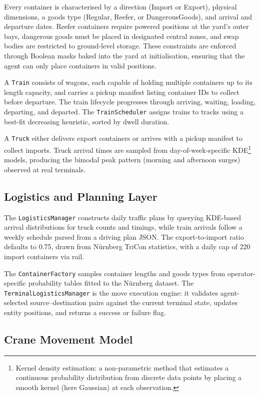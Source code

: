 Every container is characterised by a direction (Import or Export), physical dimensions, a goods type (Regular, Reefer, or DangerousGoods), and arrival and departure dates. Reefer containers require powered positions at the yard's outer bays, dangerous goods must be placed in designated central zones, and swap bodies are restricted to ground-level storage. These constraints are enforced through Boolean masks baked into the yard at initialisation, ensuring that the agent can only place containers in valid positions.

A \texttt{Train} consists of wagons, each capable of holding multiple containers up to its length capacity, and carries a pickup manifest listing container IDs to collect before departure. The train lifecycle progresses through arriving, waiting, loading, departing, and departed. The \texttt{TrainScheduler} assigns trains to tracks using a best-fit decreasing heuristic, sorted by dwell duration.

A \texttt{Truck} either delivers export containers or arrives with a pickup manifest to collect imports. Truck arrival times are sampled from day-of-week-specific KDE\footnote{Kernel density estimation: a non-parametric method that estimates a continuous probability distribution from discrete data points by placing a smooth kernel (here Gaussian) at each observation.} models, producing the bimodal peak pattern (morning and afternoon surges) observed at real terminals.

\subsection{Logistics and Planning Layer}
\label{sec:sys:env:logistics}

The \texttt{LogisticsManager} constructs daily traffic plans by querying KDE-based arrival distributions for truck counts and timings, while train arrivals follow a weekly schedule parsed from a driving plan JSON. The export-to-import ratio defaults to 0.75, drawn from N\"urnberg TriCon statistics, with a daily cap of 220 import containers via rail.

The \texttt{ContainerFactory} samples container lengths and goods types from operator-specific probability tables fitted to the N\"urnberg dataset. The \texttt{TerminalLogisticsManager} is the move execution engine: it validates agent-selected source--destination pairs against the current terminal state, updates entity positions, and returns a success or failure flag.

\subsection{Crane Movement Model}
\label{sec:sys:env:rmgc}

